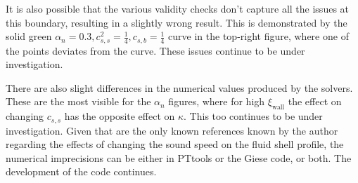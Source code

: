 It is also possible that the various validity checks don't capture all the issues at this boundary,
resulting in a slightly wrong result.
This is demonstrated by the solid green $\alpha_n = 0.3, c_{s,s}^2 = \frac{1}{4}, c_{s,b} = \frac{1}{4}$ curve in the top-right figure,
where one of the points deviates from the curve.
These issues continue to be under investigation.

There are also slight differences in the numerical values produced by the solvers.
These are the most visible for the $\alpha_n$ figures, where for high $\xi_\text{wall}$ the effect on changing $c_{s,s}$ has the opposite effect on $\kappa$.
This too continues to be under investigation.
Given that \cites{giese_2020}{giese_2021} are the only known references known by the author regarding the effects of changing the sound speed on the fluid shell profile,
the numerical imprecisions can be either in PTtools or the Giese code, or both.
The development of the code continues.
